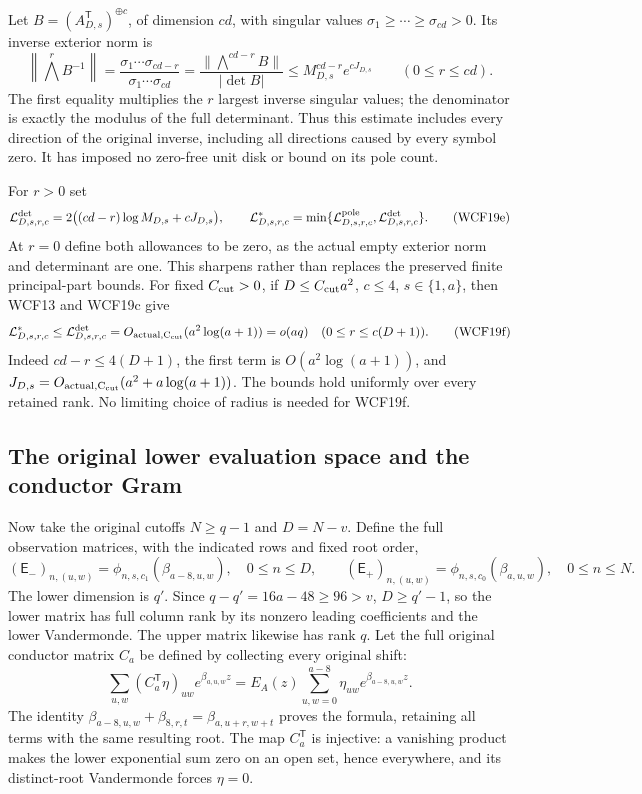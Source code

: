 Let $B=(A_{D,s}^{\mathsf T})^{\oplus c}$, of dimension $cd$, with
singular values $\sigma_1\ge\cdots\ge\sigma_{cd}>0$. Its inverse
exterior norm is
\[
 \left\|\bigwedge^rB^{-1}\right\|
 =\frac{\sigma_1\cdots\sigma_{cd-r}}
           {\sigma_1\cdots\sigma_{cd}}
 =\frac{\|\bigwedge^{cd-r}B\|}{|\det B|}
 \le M_{D,s}^{cd-r}e^{cJ_{D,s}}\qquad(0\le r\le cd).
 \tag{WCF19d}
\]
The first equality multiplies the $r$ largest inverse singular values;
the denominator is exactly the modulus of the full determinant. Thus
this estimate includes every direction of the original inverse, including
all directions caused by every symbol zero. It has imposed no zero-free
unit disk or bound on its pole count.

For $r>0$ set
\[
 \mathcal L^{\rm det}_{D,s,r,c}
 =2\bigl((cd-r)\log M_{D,s}+cJ_{D,s}\bigr),\qquad
 \mathcal L^*_{D,s,r,c}
 =\min\{\mathcal L^{\rm pole}_{D,s,r,c},
                         \mathcal L^{\rm det}_{D,s,r,c}\}.
 \tag{WCF19e}
\]
At $r=0$ define both allowances to be zero, as the actual empty
exterior norm and determinant are one. This sharpens rather than
replaces the preserved finite principal-part bounds. For fixed $C_{\rm cut}>0$, if
$D\le C_{\rm cut}a^2$, $c\le4$, $s\in\{1,a\}$, then WCF13 and WCF19c give
\[
 \mathcal L^*_{D,s,r,c}
 \le\mathcal L^{\rm det}_{D,s,r,c}
 =O_{\rm actual,C_{\rm cut}}(a^2\log(a+1))=o(aq)
 \quad(0\le r\le c(D+1)).
 \tag{WCF19f}
\]
Indeed $cd-r\le4(D+1)$, the first term is
$O(a^2\log(a+1))$, and $J_{D,s}=O_{\rm actual,C_{\rm cut}}(a^2+
a\log(a+1))$. The bounds hold uniformly over every retained rank.
No limiting choice of radius is needed for WCF19f.

\subsection{The original lower evaluation space and the conductor Gram}

Now take the original cutoffs $N\ge q-1$ and $D=N-v$. Define
the full observation matrices, with the indicated rows and fixed root order,
\[
 (\mathsf E_-)_{n,(u,w)}=\phi_{n,s,c_1}(\beta_{a-8,u,w}),\quad0\le n\le D,
 \qquad
 (\mathsf E_+)_{n,(u,w)}=\phi_{n,s,c_0}(\beta_{a,u,w}),\quad0\le n\le N.
 \tag{WCF20}
\]
The lower dimension is $q'$. Since $q-q'=16a-48\ge96>v$,
$D\ge q'-1$, so the lower matrix has full column rank by its
nonzero leading coefficients and the lower Vandermonde. The upper
matrix likewise has rank $q$. Let the full original conductor matrix
$C_a$ be defined by collecting every original shift:
\[
 \sum_{u,w}(C_a^{\mathsf T}\eta)_{uw}e^{\beta_{a,u,w}z}
       =E_A(z)\sum_{u,w=0}^{a-8}\eta_{uw}e^{\beta_{a-8,u,w}z}.
 \tag{WCF21}
\]
The identity $\beta_{a-8,u,w}+\beta_{8,r,t}=\beta_{a,u+r,w+t}$
proves the formula, retaining all terms with the same resulting root.
The map $C_a^{\mathsf T}$ is injective: a vanishing product makes
the lower exponential sum zero on an open set, hence everywhere,
and its distinct-root Vandermonde forces $\eta=0$.

